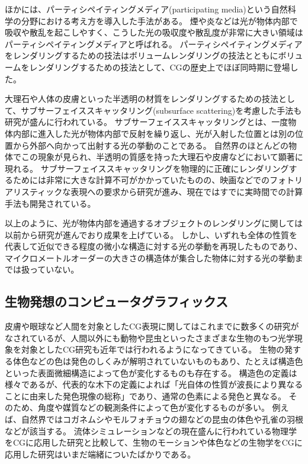 ほかには、パーティシペイティングメディア(participating media)という自然科学の分野における考え方を導入した手法がある。
煙や炎などは光が物体内部で吸収や散乱を起こしやすく、こうした光の吸収度や散乱度が非常に大きい領域はパーティシペイティングメディアと呼ばれる。
パーティシペイティングメディアをレンダリングするための技法はボリュームレンダリングの技法とともにボリュームをレンダリングするための技法として、CGの歴史上でほぼ同時期に登場した\cite{cg-magic}。

大理石や人体の皮膚といった半透明の材質をレンダリングするための技法として、サブサーフェイススキャッタリング(subsurface scattering)を考慮した手法も研究が盛んに行われている。
サブサーフェイススキャッタリングとは、一度物体内部に進入した光が物体内部で反射を繰り返し、光が入射した位置とは別の位置から外部へ向かって出射する光の挙動のことである。
自然界のほとんどの物体でこの現象が見られ、半透明の質感を持った大理石や皮膚などにおいて顕著に現れる。
サブサーフェイススキャッタリングを物理的に正確にレンダリングするためには非常に大きな計算不可がかかっていたものの、映画などでのフォトリアリスティックな表現への要求から研究が進み、現在ではすでに実時間での計算手法も開発されている\cite{garcia2012practical}。

以上のように、光が物体内部を通過するオブジェクトのレンダリングに関しては以前から研究が進んでおり成果を上げている。
しかし、いずれも全体の性質を代表して近似できる程度の微小な構造に対する光の挙動を再現したものであり、マイクロメートルオーダーの大きさの構造体が集合した物体に対する光の挙動までは扱っていない。

\subsection{生物発想のコンピュータグラフィックス}

皮膚や眼球など人間を対象としたCG表現に関してはこれまでに数多くの研究がなされているが\cite{jorge-jimenez2013}、人間以外にも動物や昆虫といったさまざまな生物のもつ光学現象を対象としたCG研究も近年では行われるようになってきている。
生物の発する体色などの色は発色のしくみが解明されていないものもあり、たとえば構造色といった表面微細構造によって色が変化するものも存在する。
構造色の定義は様々であるが、代表的な木下\cite{kinosita-木下修一2001総論}の定義によれば「光自体の性質が波長により異なることに由来した発色現像の総称」であり、通常の色素による発色と異なる。
そのため、角度や媒質などの観測条件によって色が変化するものが多い。
例えば、自然界ではコガネムシやモルフォチョウの翅などの昆虫の体色や孔雀の羽根などが該当する。
流体シミュレーションなどの現在盛んに行われている物理学をCGに応用した研究\cite{akinci2013versatile}と比較して、生物のモーションや体色などの生物学をCGに応用した研究はいまだ端緒についたばかりである。

